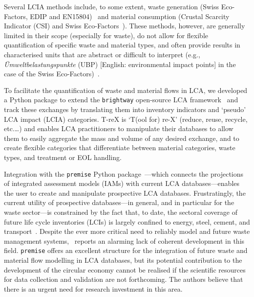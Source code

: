 \documentclass[a4paper,fleqn]{cas-dc}
\renewcommand{\texttt}[1]{{\ttfamily\small\nolinkurl{#1}}}
\begin{document}
Several LCIA methods include, to some extent, waste generation (Swiss
Eco-Factors, EDIP and
EN15804)~\citep{foen2021ecofactors,hauschild2003edip,cen2019en15804} and
material consumption (Crustal Scarcity Indicator (CSI) and Swiss
Eco-Factors~\citep{arvidsson2020csi,foen2021ecofactors}). These methods,
however, are generally limited in their scope (especially for waste), do not
allow for flexible quantification of specific waste and material types, and
often provide results in characterised units that are abstract or difficult to
interpret (e.g., \textit{Ümweltbelastungspunkte} (UBP) [English: environmental
	impact points] in the case of the Swiss
Eco-Factors)~\citep{su2020sustainableproddev}.

To facilitate the quantification of waste and material flows in LCA, we
developed a Python package to extend the \texttt{brightway} open-source LCA
framework~\citep{mutel2017brightway} and track these exchanges by translating
them into inventory indicators and `pseudo' LCA impact (LCIA) categories. T-reX
is `T(ool for) re-X' (reduce, reuse, recycle, etc.\@ \ldots) and enables LCA
practitioners to manipulate their databases to allow them to easily aggregate
the mass and volume of any desired exchange, and to create flexible categories
that differentiate between material categories, waste types, and treatment or
EOL handling.

Integration with the \texttt{premise} Python
package~\citep{sacchi2022premise}---which connects the projections of
integrated assessment models (IAMs) with current LCA databases---enables the
user to create and manipulate prospective LCA databases. Frustratingly, the
current utility of prospective databases---in general, and in particular for
the waste sector---is constrained by the fact that, to date, the sectoral
coverage of future life cycle inventories (LCIs) is largely confined to energy,
steel, cement, and transport~\citep{sacchi2023premisedocs}. Despite the ever
more critical need to reliably model and future waste management
systems,~\cite{bisinella2024wastelca} reports an alarming lack of coherent
development in this field. \texttt{premise} offers an excellent structure for
the integration of future waste and material flow modelling in LCA databases,
but its potential contribution to the development of the circular economy
cannot be realised if the scientific resources for data collection and
validation are not forthcoming. The authors believe that there is an urgent
need for research investment in this area.
\end{document}
